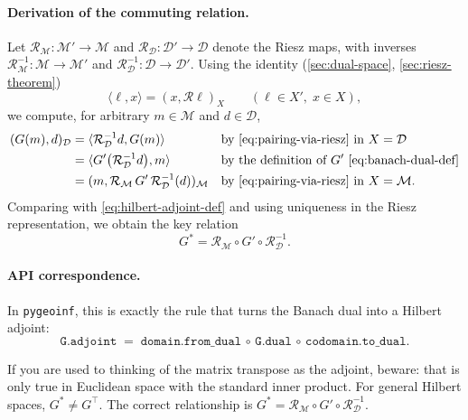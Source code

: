 \documentclass[11pt,twoside,openright]{book}
\theoremstyle{plain}
\theoremstyle{definition}
\theoremstyle{remark}
\newcommand{\modelspace}{\mathcal{M}}
\newcommand{\dataspace}{\mathcal{D}}
\newcommand{\ipM}[2]{(#1,#2)_{\modelspace}}
\newcommand{\ipD}[2]{(#1,#2)_{\dataspace}}
\newcommand{\ip}[3]{(#1,#2)_{#3}}         %
\newcommand{\pair}[2]{\langle #1, #2\rangle}
\newcommand{\Riesz}{\mathcal{R}}
\begin{document}
\paragraph{Derivation of the commuting relation.}
Let $\Riesz_{\modelspace}:\modelspace'\to\modelspace$ and
$\Riesz_{\dataspace}:\dataspace'\to\dataspace$ denote the Riesz maps, with
inverses $\Riesz_{\modelspace}^{-1}:\modelspace\to\modelspace'$ and
$\Riesz_{\dataspace}^{-1}:\dataspace\to\dataspace'$.
Using the identity (\cref{sec:dual-space}, \cref{sec:riesz-theorem})
\begin{equation}
  \label{eq:pairing-via-riesz}
  \pair{\ell}{x} = \ip{x}{\Riesz\ell}{X}
  \qquad (\ell\in X',\; x\in X),
\end{equation}
we compute, for arbitrary $m\in\modelspace$ and $d\in\dataspace$,
\begin{align}
  \ipD{G(m)}{d}
  &= \pair{\Riesz_{\dataspace}^{-1} d}{G(m)}
    && \text{by \eqref{eq:pairing-via-riesz} in $X=\dataspace$} \\
  &= \pair{G'\bigl(\Riesz_{\dataspace}^{-1} d\bigr)}{m}
    && \text{by the definition of $G'$ \eqref{eq:banach-dual-def}} \\
  &= \ipM{m}{\Riesz_{\modelspace}\,G'\,\Riesz_{\dataspace}^{-1}(d)}
    && \text{by \eqref{eq:pairing-via-riesz} in $X=\modelspace$.}
\end{align}
Comparing with \eqref{eq:hilbert-adjoint-def} and using uniqueness in the Riesz
representation, we obtain the key relation
\begin{equation}
  \label{eq:adjoint-from-dual}
  G^* = \Riesz_{\modelspace} \circ G' \circ \Riesz_{\dataspace}^{-1}.
\end{equation}

\paragraph{API correspondence.}
In \texttt{pygeoinf}, this is exactly the rule that turns the Banach dual into a
Hilbert adjoint:
\begin{equation}
  \texttt{G.adjoint} \;=\; \texttt{domain.from\_dual}\,\circ\,\texttt{G.dual}\,\circ\,\texttt{codomain.to\_dual}.
\end{equation}

\begin{pitfallbox}
If you are used to thinking of the matrix transpose as the adjoint, beware:
that is only true in Euclidean space with the standard inner product.
For general Hilbert spaces, $G^* \neq G^\top$. The correct relationship is
$G^* = \Riesz_{\modelspace} \circ G' \circ \Riesz_{\dataspace}^{-1}$.
\end{pitfallbox}
\end{document}
